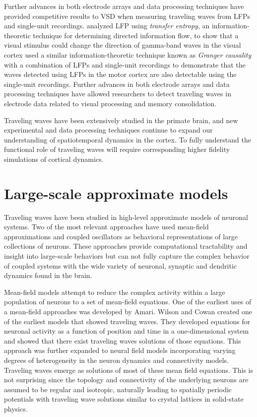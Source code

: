 Further advances in both electrode arrays and data processing techniques have provided competitive results to 
VSD when measuring traveling waves from LFPs and single-unit recordings.
\citet{Besserve2015} analyzed LFP using \textit{transfer entropy}, an information-theoretic technique for determining directed information flow,
to show that a visual stimulus could change the direction of gamma-band waves in the visual cortex
\citet{Takahashi2015} used a similar information-theoretic technique known as \textit{Granger causality} with a combination of LFPs and single-unit recordings
to demonstrate that the waves detected using LFPs in the motor cortex are also detectable using the single-unit recordings.
Further advances in both electrode arrays\citep{Maynard1997} and data processing techniques\citep{Muller2016} have allowed researchers to detect traveling waves in electrode data 
related to visual processing\citep{Davis2020} and memory consolidation\citep{Dickey2021}.

Traveling waves have been extensively studied in the primate brain, and new experimental and data processing techniques 
continue to expand our understanding of spatiotemporal dynamics in the cortex.
To fully understand the functional role of traveling waves will require corresponding higher fidelity simulations of cortical dynamics.

\section{Large-scale approximate models}
Traveling waves have been studied in high-level approximate models of neuronal systems.
Two of the most relevant approaches have used mean-field approximations and coupled oscillators as behavioral representations of large collections of neurons.
These approaches provide computational tractability and insight into large-scale behaviors but can not fully capture the complex behavior of coupled systems with the wide variety of neuronal, 
synaptic and dendritic dynamics found in the brain.

Mean-field models attempt to reduce the complex activity within a large population of neurons to a set of mean-field equations.
One of the earliest uses of a mean-field approaches was developed by Amari\citep{Amari1972}\citep{Amari1977}.
Wilson and Cowan\citep{Wilson1973} created one of the earliest models that showed traveling waves. 
They developed equations for neuronal activity as a function of position and time in a one-dimensional system and showed that there exist traveling waves solutions of those equations.
This approach was further expanded \citep{Ermentrout1979}\citep{Sompolinsky1988}\citep{Vreeswijk1998}\citep{Faugeras2009} to neural field models incorporating 
varying degrees of heterogeneity in the neuron dynamics and connectivity models.
Traveling waves emerge as solutions of most of these mean field equations.
This is not surprising since the topology and connectivity of the underlying neurons are assumed to be regular and isotropic, naturally leading to 
spatially periodic potentials with traveling wave solutions similar to crystal lattices in solid-state physics.

